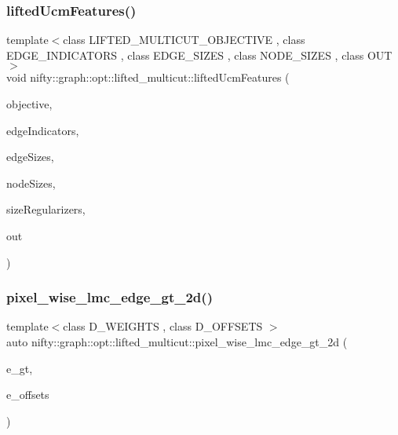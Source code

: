 \subsubsection{\texorpdfstring{lifted\+Ucm\+Features()}{liftedUcmFeatures()}}
{\footnotesize\ttfamily template$<$class L\+I\+F\+T\+E\+D\+\_\+\+M\+U\+L\+T\+I\+C\+U\+T\+\_\+\+O\+B\+J\+E\+C\+T\+I\+VE , class E\+D\+G\+E\+\_\+\+I\+N\+D\+I\+C\+A\+T\+O\+RS , class E\+D\+G\+E\+\_\+\+S\+I\+Z\+ES , class N\+O\+D\+E\+\_\+\+S\+I\+Z\+ES , class O\+UT $>$ \\
void nifty\+::graph\+::opt\+::lifted\+\_\+multicut\+::lifted\+Ucm\+Features (\begin{DoxyParamCaption}\item[{const L\+I\+F\+T\+E\+D\+\_\+\+M\+U\+L\+T\+I\+C\+U\+T\+\_\+\+O\+B\+J\+E\+C\+T\+I\+VE \&}]{objective,  }\item[{const E\+D\+G\+E\+\_\+\+I\+N\+D\+I\+C\+A\+T\+O\+RS \&}]{edge\+Indicators,  }\item[{const E\+D\+G\+E\+\_\+\+S\+I\+Z\+ES \&}]{edge\+Sizes,  }\item[{const N\+O\+D\+E\+\_\+\+S\+I\+Z\+ES \&}]{node\+Sizes,  }\item[{std\+::vector$<$ double $>$}]{size\+Regularizers,  }\item[{O\+UT \&}]{out }\end{DoxyParamCaption})}

\mbox{\label{namespacenifty_1_1graph_1_1opt_1_1lifted__multicut_a1f91d320198cd16ee6b0867a08f1e09e}} 
\subsubsection{\texorpdfstring{pixel\+\_\+wise\+\_\+lmc\+\_\+edge\+\_\+gt\+\_\+2d()}{pixel\_wise\_lmc\_edge\_gt\_2d()}}
{\footnotesize\ttfamily template$<$class D\+\_\+\+W\+E\+I\+G\+H\+TS , class D\+\_\+\+O\+F\+F\+S\+E\+TS $>$ \\
auto nifty\+::graph\+::opt\+::lifted\+\_\+multicut\+::pixel\+\_\+wise\+\_\+lmc\+\_\+edge\+\_\+gt\+\_\+2d (\begin{DoxyParamCaption}\item[{const xt\+::xexpression$<$ D\+\_\+\+W\+E\+I\+G\+H\+TS $>$ \&}]{e\+\_\+gt,  }\item[{const xt\+::xexpression$<$ D\+\_\+\+O\+F\+F\+S\+E\+TS $>$ \&}]{e\+\_\+offsets }\end{DoxyParamCaption})}

